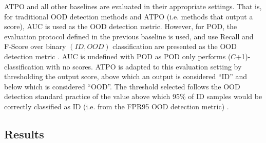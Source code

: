 ATPO and all other baselines are evaluated in their appropriate settings. That is, for traditional OOD detection methods and ATPO (i.e. methods that output a score), AUC is used as the OOD detection metric. However, for POD, the evaluation protocol defined in the previous baseline is used, and use Recall and F-Score over binary $(ID,OOD)$ classification are presented as the OOD detection metric \cite{wang2024beyond}. AUC is undefined with POD as POD only performs ($C$+1)-classification with no scores. ATPO is adapted to this evaluation setting by thresholding the output score, above which an output is considered ``ID'' and below which is considered ``OOD''. The threshold selected follows the OOD detection standard practice of the value above which 95\% of ID samples would be correctly classified as ID (i.e. from the FPR95 OOD detection metric) \cite{zhang2023openood}.

\subsection{Results}
\label{sec:atpo_results}

